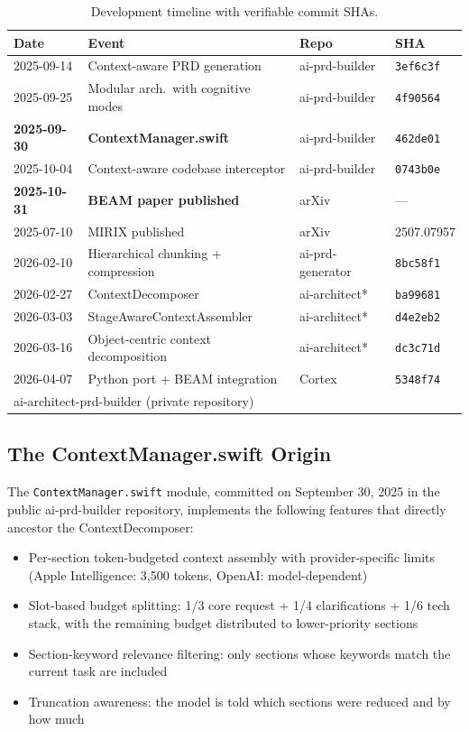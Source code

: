 \documentclass[11pt]{article}
\begin{document}
\begin{table}[t]
\centering
\caption{Development timeline with verifiable commit SHAs.}
\label{tab:timeline}
\small
\begin{tabular}{llll}
\toprule
Date & Event & Repo & SHA \\
\midrule
2025-09-14 & Context-aware PRD generation & ai-prd-builder & \texttt{3ef6c3f} \\
2025-09-25 & Modular arch.\ with cognitive modes & ai-prd-builder & \texttt{4f90564} \\
\textbf{2025-09-30} & \textbf{ContextManager.swift} & ai-prd-builder & \texttt{462de01} \\
2025-10-04 & Context-aware codebase interceptor & ai-prd-builder & \texttt{0743b0e} \\
\textbf{2025-10-31} & \textbf{BEAM paper published} & arXiv & --- \\
2025-07-10 & MIRIX published & arXiv & 2507.07957 \\
2026-02-10 & Hierarchical chunking + compression & ai-prd-generator & \texttt{8bc58f1} \\
2026-02-27 & ContextDecomposer & ai-architect* & \texttt{ba99681} \\
2026-03-03 & StageAwareContextAssembler & ai-architect* & \texttt{d4e2eb2} \\
2026-03-16 & Object-centric context decomposition & ai-architect* & \texttt{dc3c71d} \\
2026-04-07 & Python port + BEAM integration & Cortex & \texttt{5348f74} \\
\bottomrule
\multicolumn{4}{l}{\footnotesize *ai-architect-prd-builder (private repository)} \\
\end{tabular}
\end{table}

\subsection{The ContextManager.swift Origin}

The \texttt{ContextManager.swift} module, committed on September 30,
2025 in the public ai-prd-builder repository, implements the following
features that directly ancestor the ContextDecomposer:

\begin{itemize}
  \item Per-section token-budgeted context assembly with
    provider-specific limits (Apple Intelligence: 3,500 tokens,
    OpenAI: model-dependent)
  \item Slot-based budget splitting: 1/3 core request + 1/4
    clarifications + 1/6 tech stack, with the remaining budget
    distributed to lower-priority sections
  \item Section-keyword relevance filtering: only sections whose
    keywords match the current task are included
  \item Truncation awareness: the model is told which sections were
    reduced and by how much
\end{itemize}
\end{document}
